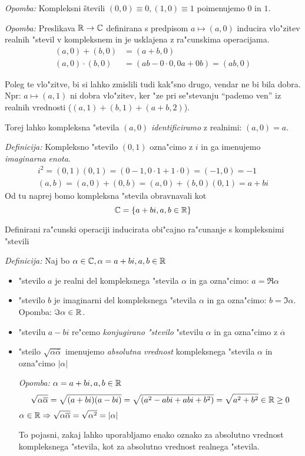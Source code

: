 \emph{Opomba:} Kompleksni števili $(0, 0) \equiv 0, (1, 0) \equiv 1$ poimenujemo $0$ in $1$.

\emph{Opomba:} Preslikava $\mathbb{R} \rightarrow \mathbb{C}$ definirana s predpisom $a \mapsto (a, 0)$ inducira vlo"zitev realnih "stevil v kompleksnem in je usklajena z ra"cunskima operacijama.
\begin{align*}
(a, 0) + (b, 0) &= (a + b, 0)\\
(a, 0) \cdot (b, 0) &= (ab - 0\cdot 0, 0a + 0b) = (ab, 0)
\end{align*}

Poleg te vlo"zitve, bi si lahko zmislili tudi kak"sno drugo, vendar ne bi bila dobra. Npr: $a \mapsto (a, 1)$ ni dobra vlo"zitev, ker "ze pri se"stevanju ``pademo ven'' iz realnih vrednosti ($(a, 1) + (b, 1) + (a+b, 2)$).

Torej lahko kompleksna "stevila $(a, 0)$ \emph{identificiramo} z realnimi: $(a, 0) = a$.

\emph{Definicija:} Kompleksno "stevilo $(0, 1)$ ozna"cimo z $i$ in ga imenujemo \emph{imaginarna enota}.
\begin{gather*}
	i^2 = (0, 1)(0, 1) = (0-1, 0\cdot 1 + 1\cdot 0) = (-1, 0) = -1\\
	(a, b) = (a, 0) + (0, b) = (a, 0) + (b, 0) (0, 1) = a + bi
\end{gather*}
Od tu naprej bomo kompleksna "stevila obravnavali kot
\begin{equation*}
\mathbb{C} = \{a + bi, a, b \in \mathbb{R}\}
\end{equation*}

Definirani ra"cunski operaciji inducirata obi"cajno ra"cunanje s kompleksnimi "stevili

\emph{Definicija:} Naj bo $\alpha \in \mathbb{C}, \alpha = a+bi, a, b \in \mathbb{R}$
\begin{itemize}
	\item "stevilo $a$ je realni del kompleksnega "stevila $\alpha$ in ga ozna"cimo: $a = \Re \alpha$
	\item "stevilo $b$ je imaginarni del kompleksnega "stevila $\alpha$ in ga ozna"cimo: $b = \Im \alpha$. Opomba: $\Im \alpha \in \mathbb{R}$.
	\item "stevilu $a - bi$ re"cemo \emph{konjugirano "stevilo} "stevilu $\alpha$ in ga ozna"cimo z $\overline{\alpha}$
	\item "steilo $\sqrt{\alpha \overline{\alpha}}$ imenujemo \emph{absolutna vrednost} kompleksnega "stevila $\alpha$ in ozna"cimo $|\alpha|$
	
	\emph{Opomba:} $\alpha = a + bi, a, b \in \mathbb{R}$
	\begin{equation*}
	\sqrt{\alpha \overline{\alpha}} = \sqrt{(a + bi)(a-bi)} = \sqrt{(a^2 - abi + abi + b^2)} = \sqrt{a^2 + b^2} \in \mathbb{R} \geq 0
	\end{equation*}
	$\alpha \in \mathbb{R} \Rightarrow \sqrt{\alpha \overline{\alpha}} = \sqrt{\alpha^2} = |\alpha|$
	
	To pojasni, zakaj lahko uporabljamo enako oznako za absolutno vrednost kompleksnega "stevila, kot za absolutno vrednost realnega "stevila.
\end{itemize}

